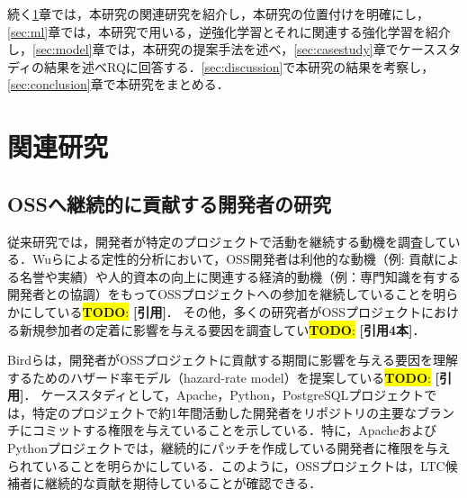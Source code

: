 \documentclass[submit,techrep,noauthor]{ipsj}
\newcommand{\todo}[1]{\colorbox{yellow}{{\bf TODO}:}{\color{red} {\textbf{[#1]}}}}
\begin{document}
続く\ref{sec:related}章では，本研究の関連研究を紹介し，本研究の位置付けを明確にし，\ref{sec:ml}章では，本研究で用いる，逆強化学習とそれに関連する強化学習を紹介し，\ref{sec:model}章では，本研究の提案手法を述べ，\ref{sec:casestudy}章でケーススタディの結果を述べRQに回答する．\ref{sec:discussion}で本研究の結果を考察し，\ref{sec:conclusion}章で本研究をまとめる．




\section{関連研究}\label{sec:related}

\subsection{OSSへ継続的に貢献する開発者の研究}

従来研究では，開発者が特定のプロジェクトで活動を継続する動機を調査している．Wuらによる定性的分析において，OSS開発者は利他的な動機（例: 貢献による名誉や実績）や人的資本の向上に関連する経済的動機（例：専門知識を有する開発者との協調）をもってOSSプロジェクトへの参加を継続していることを明らかにしている\todo{引用}．
その他，多くの研究者がOSSプロジェクトにおける新規参加者の定着に影響を与える要因を調査してい\todo{引用4本}．

Birdらは，開発者がOSSプロジェクトに貢献する期間に影響を与える要因を理解するためのハザード率モデル（hazard-rate model）を提案している\todo{引用}．
ケーススタディとして，Apache，Python，PostgreSQLプロジェクトでは，特定のプロジェクトで約1年間活動した開発者をリポジトリの主要なブランチにコミットする権限を与えていることを示している．特に，ApacheおよびPythonプロジェクトでは，継続的にパッチを作成している開発者に権限を与えられていることを明らかにしている．このように，OSSプロジェクトは，LTC候補者に継続的な貢献を期待していることが確認できる．
\end{document}
